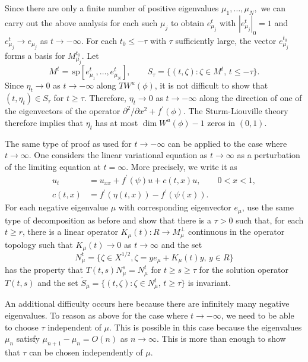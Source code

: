 \documentclass{surv-l}
\theoremstyle{plain}
\theoremstyle{definition}
\numberwithin{equation}{section}
\numberwithin{figure}{chapter}
\begin{document}
Since there are only a finite number of positive eigenvalues $\mu_{1}, \ldots, \mu_{N},$ we can carry out the above analysis for each such $\mu_{j}$ to obtain $e_{\mu_{j}}^{t}$ with $|e_{\mu_{j}}^{t}|_{0}=1$ and $e_{\mu_{j}}^{t}\rightarrow e_{\mu_{j}}$ as $ t\rightarrow-\infty$. For each $ t_{0}\leq-\tau$ with $\tau$ sufficiently large, the vector $e_{{\mu}_{j}}^{{t}_{0}}$ forms a basis for $M_{{\mu}_{j}}^{{t}_{0}}$. Let
\begin{equation*}
M^{t}=\, \mathrm{sp}[e_{\mu_{1}}^{t}, \ldots, e_{\mu_{N}}^{t}],\qquad S_{\tau}=\{(t, \zeta):\zeta \in M^{t},\, t\leq-\tau\}.
\end{equation*}
Since $\eta_{t}\rightarrow 0$ as $ t\rightarrow-\infty$ along $TW^{u}(\phi)$, it is not difficult to show that $(t, \eta_{t})\in S_{\tau}$ for $ t\geq\tau$. Therefore, $\eta_{t}\rightarrow 0$ as $ t\rightarrow-\infty$ along the direction of one of the eigenvectors of the operator $\partial^{2}/\partial x^{2}+f^{\prime}(\phi)$. The Sturm-Liouville theory therefore implies that $\eta_{t}$ has at most $\dim W^{u}(\phi)-1$ zeros in $(0,1)$.

The same type of proof as used for $ t\rightarrow-\infty$ can be applied to the case where $ t\rightarrow\infty$. One considers the linear variational equation as $ t\rightarrow\infty$ as a perturbation of the limiting equation at $ t=\infty$. More precisely, we write it as
\begin{align*}
u_{t}&=u_{xx}+f^{\prime}(\psi)u+c(t, x)u,\qquad 0<x<1,\\
c(t, x)&=f^{\prime}(\eta(t,x))-f^{\prime}(\psi(x)).
\end{align*}
For each negative eigenvalue $\mu$ with corresponding eigenvector $e_{\mu}$, use the same type of decomposition as before and show that there is a $\tau>0$ such that, for each $t\geq r$, there is a linear operator $K_{\mu}(t)\!:R\rightarrow M_{\mu}^{\perp}$ continuous in the operator topology such that $K_{\mu}(t)\rightarrow 0$ as $ t\rightarrow\infty$ and the set
\begin{equation*}
N_{\mu}^{t}=\{\zeta\in X^{1/2}, \zeta=ye_{\mu}+K_{\mu}(t)y,\, y\in R\}
\end{equation*}
has the property that $T(t, s)N_{\mu}^{s}=N_{\mu}^{t}$ for $ t\geq s\geq\tau$ for the solution operator $T(t, s)$ and the set $\tilde{S}_{\mu}=\{(t, \zeta)\!:\zeta\in N_{\mu}^{t},\, t\geq\tau\}$ is invariant.



An additional difficulty occurs here because there are infinitely many negative eigenvalues. To reason as above for the case where $ t\rightarrow-\infty$, we need to be able to choose $\tau$ independent of $\mu$. This is possible in this case because the eigenvalues $\mu_{n}$ satisfy $\mu_{n+1}-\mu_{n}=O(n)$ as $ n\rightarrow\infty$. This is more than enough to show that $\tau$ can be chosen independently of $\mu$.
\end{document}
